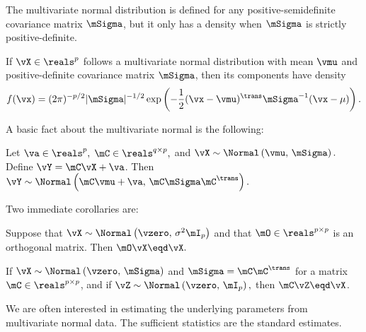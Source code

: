 \noindent
The multivariate normal distribution is defined for any positive-semidefinite covariance matrix $\mSigma$, but it only has a density when $\mSigma$ is strictly positive-definite.

\begin{proposition}
If $\vX \in \reals^p$ follows a multivariate normal distribution with mean $\vmu$ and positive-definite covariance matrix $\mSigma$, then its components have density
\begin{equation}\label{E:normal-density}
    f( \vx )
    =
    (2 \pi )^{-p/2}
    |\mSigma|^{-1/2}
    \exp\left(
        -
        \frac{1}{2}
        (\vx - \vmu)^\trans
        \mSigma^{-1}
        (\vx - \mu)
    \right).
\end{equation}
\end{proposition}

A basic fact about the multivariate normal is the following:

\begin{proposition}\label{P:scale-shift-normal}
Let 
\(
    \va \in \reals^p,
\)
\(
    \mC \in \reals^{q \times p},
\)
and 
\(
    \vX 
    \sim
    \Normal \left( 
        \vmu, \,
        \mSigma
    \right).
\)
Define $\vY = \mC \vX + \va$.  Then 
\(
    \vY
    \sim
    \Normal \left( 
        \mC \vmu + \va, \,
        \mC \mSigma \mC^\trans
    \right).
\)
\end{proposition}

\noindent
Two immediate corollaries are:

\begin{corollary}\label{C:normal-orthog-invariant}
Suppose that
\(
    \vX 
    \sim 
    \Normal \left( 
        \vzero, \,
        \sigma^2 \mI_p
    \right)
\)
and that
\(
    \mO \in \reals^{p \times p}
\)
is an orthogonal matrix.  Then
\(
    \mO \vX \eqd \vX.
\)
\end{corollary}

\begin{corollary}
If
\(
    \vX 
    \sim 
    \Normal \left( 
        \vzero, \,
        \mSigma
    \right)
\)
and $\mSigma = \mC \mC^\trans$ for a matrix $\mC \in \reals^{p \times p}$,
and if
\(
    \vZ
    \sim
    \Normal \left(
        \vzero, \,
        \mI_p
    \right),
\)
then
\(
    \mC \vZ
    \eqd
    \vX
\).
\end{corollary}    

We are often interested in estimating the underlying parameters from
multivariate normal data.  The sufficient statistics are the standard
estimates.

